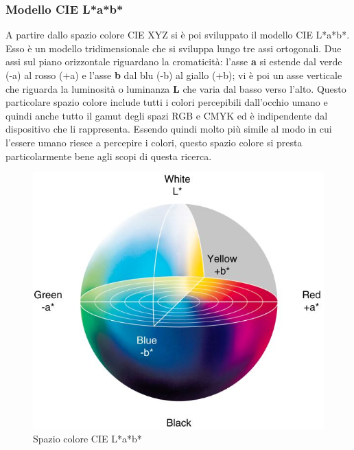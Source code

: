 \documentclass[a4paper,11pt]{article}
\begin{document}
        
    
        \newpage

        \subsubsection{Modello CIE L*a*b*}
        A partire dallo spazio colore CIE XYZ si è poi sviluppato il modello CIE L*a*b*. Esso è un modello tridimensionale che si sviluppa lungo tre assi ortogonali. Due assi sul piano orizzontale riguardano la cromaticità: l'asse \textbf{a} si estende dal verde (-a) al rosso (+a)
        e l'asse \textbf{b} dal blu (-b) al giallo (+b); vi è poi un asse verticale che riguarda la luminosità o luminanza \textbf{L} che varia dal basso verso l'alto.
        Questo particolare spazio colore include tutti i colori percepibili dall'occhio umano e quindi anche tutto il gamut degli spazi RGB e CMYK ed è indipendente dal dispositivo che li rappresenta.
        Essendo quindi molto più simile al modo in cui l'essere umano riesce a percepire i colori, questo spazio colore si presta particolarmente bene agli scopi di questa ricerca.
        \begin{figure}[h]
            \centering
            \includegraphics[scale=0.6]{CIELAB.jpg}
            \caption{Spazio colore CIE L*a*b*}
        \end{figure}

    \newpage
\end{document}
